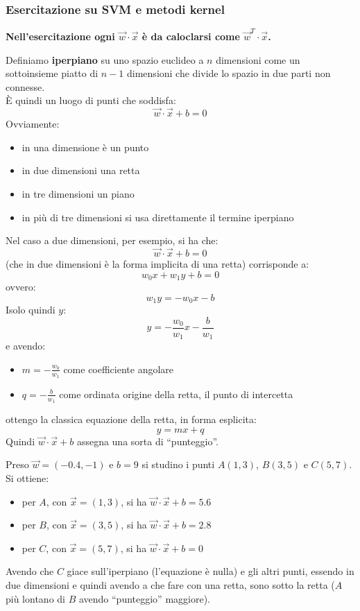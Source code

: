 \documentclass[a4paper,12pt, oneside]{book}
\begin{document}
\subsubsection{Esercitazione su SVM e metodi kernel}
\textbf{Nell'esercitazione ogni $\vec{w}\cdot\vec{x}$ è da caloclarsi come
  $\vec{w}^T\cdot\vec{x}$.} 
\begin{definizione}
  Definiamo \textbf{iperpiano} su uno spazio euclideo a $n$ dimensioni come un
  sottoinsieme piatto di $n-1$ dimensioni che divide lo spazio in due parti non
  connesse. \\
  È quindi un luogo di punti che soddisfa:
  \[\vec{w}\cdot\vec{x}+b=0\]
  Ovviamente:
  \begin{itemize}
    \item in una dimensione è un punto
    \item in due dimensioni una retta
    \item in tre dimensioni un piano
    \item in più di tre dimensioni si usa direttamente il termine iperpiano
  \end{itemize}
  Nel caso a due dimensioni, per esempio, si ha che:
  \[\vec{w}\cdot\vec{x}+b=0\]
  (che in due dimensioni è la forma implicita di una retta) corrisponde a:
  \[w_0x+w_1y+b=0\]
  ovvero:
  \[w_1y=-w_0x-b\]
  Isolo quindi $y$:
  \[y=-\frac{w_0}{w_1}x-\frac{b}{w_1}\]
  e avendo:
  \begin{itemize}
    \item $m=-\frac{w_0}{w_1}$ come coefficiente angolare
    \item $q=-\frac{b}{w_1}$ come ordinata origine della retta, il punto di
    intercetta 
  \end{itemize}
  ottengo la classica equazione della retta, in forma esplicita:
  \[y=mx+q\]
  Quindi $\vec{w}\cdot\vec{x}+b$ assegna una sorta di ``punteggio''.

\end{definizione}
\begin{esempio}
  Preso $\vec{w}=(-0.4,-1)$ e $b=9$ si studino i punti $A(1,3)$, $B(3,5)$ e
  $C(5,7)$.\\
  Si ottiene:
  \begin{itemize}
    \item per $A$, con $\vec{x}=(1,3)$, si ha $\vec{w}\cdot\vec{x}+b=5.6$
    \item per $B$, con $\vec{x}=(3,5)$, si ha $\vec{w}\cdot\vec{x}+b=2.8$
    \item per $C$, con $\vec{x}=(5,7)$, si ha $\vec{w}\cdot\vec{x}+b=0$
  \end{itemize}
  Avendo che $C$ giace sull'iperpiano (l'equazione è nulla) e gli altri punti,
  essendo in due dimensioni e quindi avendo a che fare con una retta, sono sotto
  la retta ($A$ più lontano di $B$ avendo ``punteggio'' maggiore).
\end{esempio}
\end{document}
